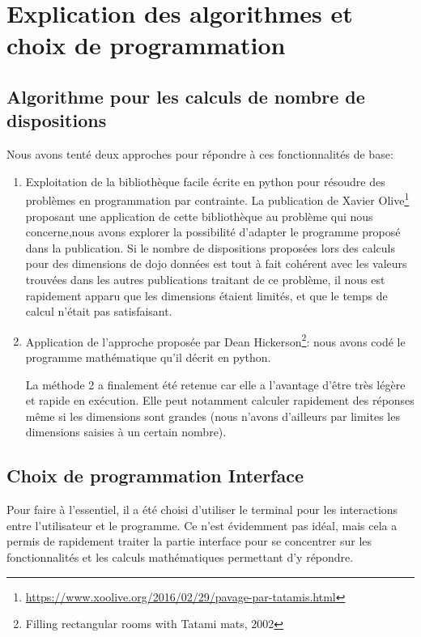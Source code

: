 \section{Explication des algorithmes et choix de programmation}

\subsection{Algorithme pour les calculs de nombre de dispositions}

Nous avons tenté deux approches pour répondre à ces fonctionnalités de base:

\begin{enumerate}
    \item Exploitation de la bibliothèque facile écrite en python pour résoudre des problèmes en programmation
          par contrainte. La publication de Xavier Olive\footnote{\url{https://www.xoolive.org/2016/02/29/pavage-par-tatamis.html}}
          proposant une application de cette  bibliothèque au problème qui nous concerne,nous avons explorer
          la possibilité d’adapter le programme proposé dans la publication. Si le nombre de dispositions proposées
          lors des calculs pour des dimensions de dojo données est tout à fait cohérent avec les valeurs trouvées
          dans les autres publications traitant de ce problème, il nous est rapidement apparu que les dimensions étaient limités,
          et que le temps de calcul n’était pas satisfaisant.
    \item Application de l’approche proposée par Dean Hickerson\footnote{Filling rectangular rooms with Tatami mats, 2002}:
          nous avons codé le programme mathématique qu’il décrit en python.

          La méthode 2 a finalement été retenue car elle a l’avantage d'être très légère et rapide en exécution.
          Elle peut notamment calculer rapidement des réponses même si les dimensions sont grandes (nous n’avons d’ailleurs par
          limites les dimensions saisies à un certain nombre).
\end{enumerate}



\subsection{Choix de programmation Interface}

Pour faire à l'essentiel, il a été choisi d'utiliser le terminal pour les interactions entre l'utilisateur et le programme.
Ce n’est évidemment pas idéal, mais cela a permis de rapidement traiter la partie interface pour se concentrer sur
les fonctionnalités et les calculs mathématiques permettant d’y répondre.

